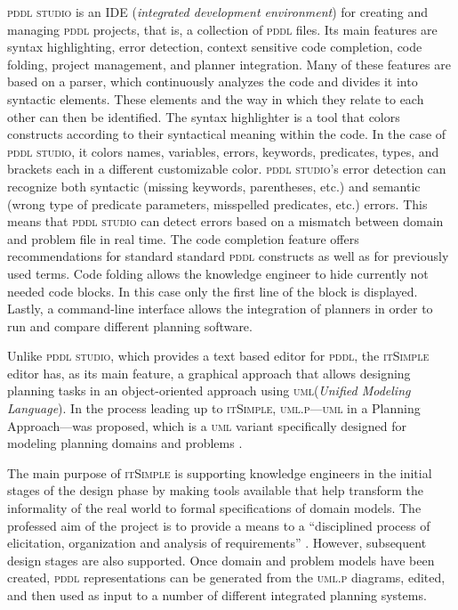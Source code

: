 \documentclass[runningheads]{llncs}
\newcommand{\pddlstudio}{\textsc{pddl studio}\xspace}
\newcommand{\itsimple}{\textsc{itSimple}\xspace}
\newcommand{\pddl}{\textsc{pddl}\xspace}
\newcommand{\uml}{\textsc{uml}\xspace}
\begin{document}
\pddlstudio \cite{plch2012inspect} is an IDE (\emph{integrated
  development environment}) for creating and managing \textsc{pddl}
projects, that is, a collection of \textsc{pddl} files. Its main
features are syntax highlighting, error detection, context sensitive
code completion, code folding, project management, and planner
integration. Many of these features are based on a parser, which
continuously analyzes the code and divides it into syntactic
elements. These elements and the way in which they relate to each
other can then be identified. The syntax highlighter is a tool that
colors constructs according to their syntactical meaning within the
code. In the case of \pddlstudio, it colors names, variables, errors,
keywords, predicates, types, and brackets each in a different
customizable color.  \pddlstudio's error detection can recognize both
syntactic (missing keywords, parentheses, etc.) and semantic (wrong
type of predicate parameters, misspelled predicates, etc.)
errors. This means that \pddlstudio can detect errors based on a
mismatch between domain and problem file in real time. The code
completion feature offers recommendations for standard standard
\textsc{pddl} constructs as well as for previously used terms. Code
folding allows the knowledge engineer to hide currently not needed
code blocks. In this case only the first line of the block is
displayed. Lastly, a command-line interface allows the integration of
planners in order to run and compare different planning software.

Unlike \pddlstudio, which provides a text based editor for \pddl, the
\itsimple \cite{vaquero2005itsimple} editor has, as its main feature,
a graphical approach that allows designing planning tasks in an
object-oriented approach using \uml (\emph{Unified Modeling
  Language}). In the process leading up to \itsimple,
\textsc{uml.p}---\textsc{uml} in a Planning Approach---was proposed,
which is a \textsc{uml} variant specifically designed for modeling
planning domains and problems \cite{vaquero2006use}.

The main purpose of \itsimple is supporting knowledge engineers in the
initial stages of the design phase by making tools available that help
transform the informality of the real world to formal specifications
of domain models. The professed aim of the project is to provide a
means to a \enquote{disciplined process of elicitation, organization
  and analysis of requirements} \cite{vaquero2005itsimple}. However,
subsequent design stages are also supported. Once domain and problem
models have been created, \textsc{pddl} representations can be
generated from the \textsc{uml.p} diagrams, edited, and then used as
input to a number of different integrated planning systems.
\end{document}
